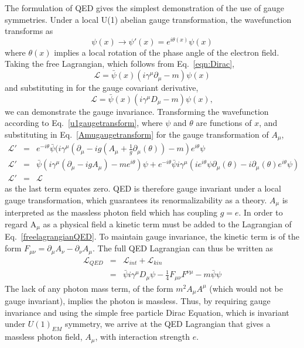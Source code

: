 The formulation of \ac{QED} gives the simplest demonstration of the use of gauge symmetries.
Under a local U(1) abelian gauge transformation, the wavefunction transforms as
\begin{equation}
\psi(x) \rightarrow \psi'(x) = e^{i \theta (x)} \psi(x)
\label{u1gaugetransform}
\end{equation}
where $\theta (x)$ implies a local rotation of the phase angle of the electron field.
Taking the free Lagrangian, which follows from Eq.~\ref{eqn:Dirac},
\begin{equation}
\mathcal{L} =  \bar{\psi}(x) (i \gamma ^{\mu} \partial_{\mu} - m) \psi(x)
\end{equation}
and substituting in for the gauge covariant derivative,
\begin{equation}
\mathcal{L} =  \bar{\psi}(x)(i \gamma ^{\mu} D_{\mu} - m) \psi(x),
\label{freelagrangianQED}
\end{equation}
we can demonstrate the gauge invariance. 
Transforming the wavefunction according to Eq.~\ref{u1gaugetransform}, where $\psi$ and $\theta$ are functions of 
$x$, and substituting in Eq.~\ref{Amugaugetransform} for the gauge transformation of $A_{\mu}$,
\begin{eqnarray}
\mathcal{L}' &=& e^{-i \theta } \bar{\psi} (i \gamma ^{\mu} (\partial_{\mu} - i g (A_{\mu} + \frac{1}{g}\partial_{\mu}(\theta)) - m) e^{i \theta } \psi \\
%
\mathcal{L}' &=& \bar{\psi} (i \gamma ^{\mu} (\partial_{\mu}  - i g A_{\mu}) - m e^{i \theta } ) \psi 
+ e^{-i \theta } \bar{\psi} i \gamma ^{\mu} (i e^{i \theta} \psi \partial_{\mu}(\theta) - i \partial_{\mu}(\theta)e^{i \theta } \psi  ) \\
%
\mathcal{L}' &=& \mathcal{L} 
\end{eqnarray}
as the last term equates zero.
\ac{QED} is therefore gauge invariant under a local gauge transformation, which guarantees its renormalizability as a theory.
$A_{\mu}$ is interpreted as the massless photon field which has coupling $g=e$.
In order to regard A$_{\mu}$ as a physical field a kinetic term must be added to the Lagrangian of Eq.~\ref{freelagrangianQED}. 
To maintain gauge invariance, the kinetic term is of the form $F_{\mu\nu} = \partial_{\mu}A_{\nu} - \partial_{\nu}A_{\mu}$. The full QED Lagrangian can thus be written as
\begin{eqnarray}
\mathcal{L}_{QED} &=& \mathcal{L}_{int} +  \mathcal{L}_{kin} \\
&=&  \bar{\psi} i \gamma^{\mu} D_{\mu} \psi - \frac{1}{4}F_{\mu\nu}F^{\nu\mu} - m\bar{\psi}\psi 
\label{QEDlagrangian}
\end{eqnarray}
The lack of any photon mass term, of the form $m^{2}A_{\mu}A^{\mu}$ (which would not be gauge invariant), implies the photon is massless.
Thus, by requiring gauge invariance and using the simple free particle Dirac Equation, which is invariant under $U(1)_{EM}$ symmetry, we arrive at the \ac{QED} Lagrangian that gives a massless photon field, $A_{\mu}$, with interaction strength $e$.


